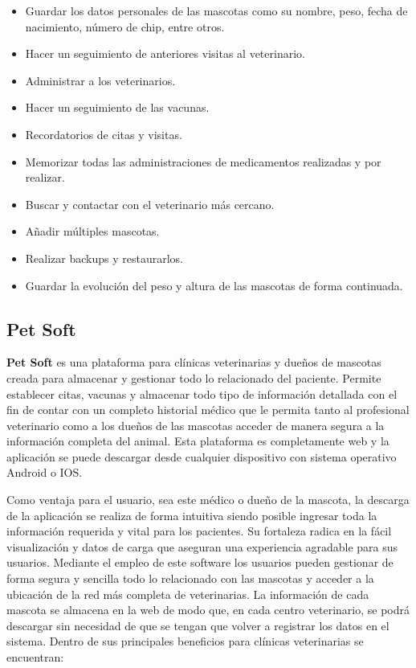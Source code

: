 \begin{itemize}
	\item	Guardar los datos personales de las mascotas como su nombre, peso, fecha de nacimiento, número de chip, entre otros.
	\item	Hacer un seguimiento de anteriores visitas al veterinario.
	\item	Administrar a los veterinarios.
	\item	Hacer un seguimiento de las vacunas.
	\item	Recordatorios de citas y visitas.
	\item	Memorizar todas las administraciones de medicamentos realizadas y por realizar.
	\item Buscar y contactar con el veterinario más cercano.
	\item	Añadir múltiples mascotas.
	\item	Realizar backups y restaurarlos.
	\item	Guardar la evolución del peso y altura de las mascotas de forma continuada.
\end{itemize}


\subsection{Pet Soft}\label{chapter:petso}

\textbf{ Pet Soft}  es una plataforma para clínicas veterinarias y dueños de mascotas creada para almacenar y gestionar todo lo relacionado del paciente. Permite establecer citas, vacunas y almacenar todo tipo de información detallada con el fin de contar con un completo historial médico que le permita tanto al profesional veterinario como a los dueños de las mascotas acceder de manera segura a la información completa del animal. Esta plataforma es completamente web y la aplicación se puede descargar desde cualquier dispositivo con sistema operativo Android o IOS.

Como ventaja para el usuario, sea este médico o dueño de la mascota, la descarga de la aplicación se realiza de forma intuitiva siendo posible ingresar toda la información requerida y vital para los pacientes. Su fortaleza radica en la fácil visualización y datos de carga que aseguran una experiencia agradable para sus usuarios. Mediante el empleo de este software los usuarios pueden gestionar de forma segura y sencilla todo lo relacionado con las mascotas y acceder a la ubicación de la red más completa de veterinarias. La información de cada mascota se almacena en la web de modo que, en cada centro veterinario, se podrá descargar sin necesidad de que se tengan que volver a registrar los datos en el sistema. Dentro de sus principales beneficios para clínicas veterinarias se encuentran:

